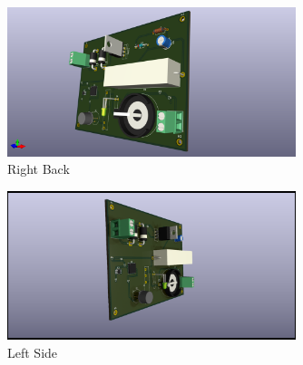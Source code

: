 \begin{figure}[H]
    \centering
    \includegraphics[width=0.75\textwidth]{image/PCB4}
    \caption{Right Back}\label{PCB4}
\end{figure}

\begin{figure}[H]
    \centering
    \includegraphics[width=0.75\textwidth]{image/PCB5}
    \caption{Left Side}\label{PCB5}
\end{figure} 
